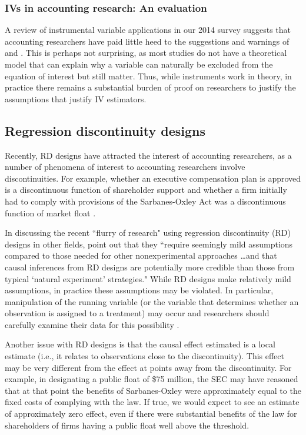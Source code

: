 \documentclass[12pt,reqno,titlepage]{amsart}
\theoremstyle{definition}
\begin{document}
\begin{doublespace}
\subsubsection{IVs in accounting research: An evaluation}
A review of instrumental variable applications in our 2014 survey suggests that accounting researchers have paid little heed to the suggestions and warnings of  \citet{Larcker:2010fq,Lennox:2012it} and \citet{Roberts:2013cz}.
This is perhaps not surprising, as most studies do not have a theoretical model that can explain why a variable can naturally be excluded from
the equation of interest but still matter. 
Thus, while instruments work in theory, in practice there remains a substantial burden of proof on researchers to justify the assumptions that justify IV estimators.

\subsection{Regression discontinuity designs}
Recently, RD designs have attracted the interest of accounting researchers, as a number of phenomena of interest to accounting researchers involve discontinuities. 
For example, whether an executive compensation plan is approved is a discontinuous function of shareholder support \citep[e.g.,][]{Armstrong:2013io} and whether a firm initially had to comply with provisions of the Sarbanes-Oxley Act was a discontinuous function of market float \citep{Iliev:2010ic} .

In discussing the recent ``flurry of research" using regression discontinuity (RD) designs in other fields, \citet[p.\,282]{Lee:2010hy} point out that they ``require seemingly mild assumptions compared to those needed for other nonexperimental approaches \dots and that causal inferences from RD designs are potentially more credible than those from typical `natural experiment' strategies."
While RD designs make relatively mild assumptions, in practice these assumptions may be violated.
In particular, manipulation of the running variable (or the variable that determines whether an observation is assigned to a treatment) may occur and researchers should carefully examine their data for this possibility \citep[see, e.g.,][]{Listokin:2008p5958,McCrary:2008ft}.

Another issue with RD designs is that the causal effect estimated is a local estimate (i.e., it relates to observations close to the discontinuity).
This effect may be very different from the effect at points away from the discontinuity.
For example, in designating a public float of \$75 million, the SEC may have reasoned that at that point the benefits of Sarbanes-Oxley were approximately equal to the fixed costs of complying with the law.
If true, we would expect to see an estimate of approximately zero effect, even if there were substantial benefits of the law for shareholders of firms having a public float well above the threshold.


\end{doublespace}
\end{document}
